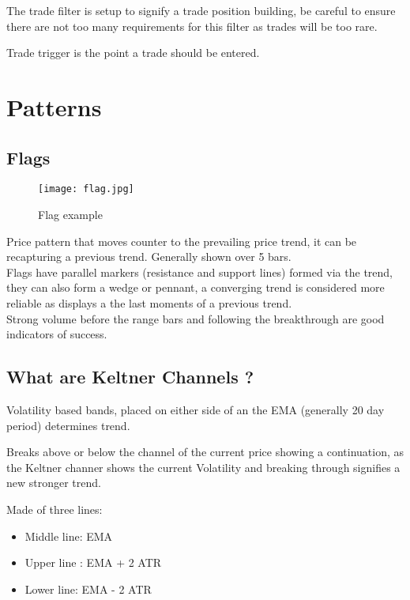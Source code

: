 \documentclass[11pt]{scrartcl} %
\begin{document}
The trade filter is setup to signify a trade position building, be careful to ensure there are not 
too many requirements for this filter as trades will be too rare.

Trade trigger is the point a trade should be entered.

\section{Patterns}

\subsection{Flags}

\begin{figure}[h] %
	\centering
	\texttt{[image: flag.jpg]} %
	\caption{Flag example}
\end{figure}

Price pattern that moves counter to the prevailing price trend, it can be recapturing a previous
trend. Generally shown over 5 bars. \\

Flags have parallel markers (resistance and support lines) formed via the trend, they can also
form a wedge or pennant, a converging trend is considered more reliable as displays a the last
moments of a previous trend.\\

Strong volume before the range bars and following the breakthrough are good indicators of success.

\subsection{What are Keltner Channels ?}

Volatility based bands, placed on either side of an the EMA (generally 20 day period) determines trend.

Breaks above or below the channel of the current price showing a continuation, as the Keltner channer
shows the current Volatility and breaking through signifies a new stronger trend.

Made of three lines:
\begin{itemize}
	\item Middle line: EMA
	\item Upper line : EMA + 2 ATR
	\item Lower line:  EMA - 2 ATR
\end{itemize}
\end{document}
